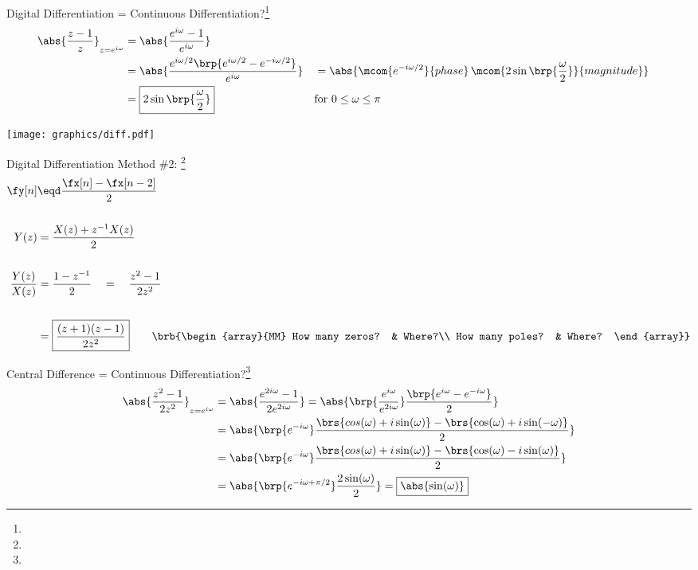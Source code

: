 \vfill
Digital Differentiation = Continuous Differentiation?\footnote{}
\vfill
\begin{align*}
  \abs{\frac{z-1}{z}}_{z=e^{i\omega}}
    &= \abs{\frac{e^{i\omega}-1}
                 {e^{i\omega}}
           }
  \\&= \abs{\frac{e^{i\omega/2}\brp{e^{i\omega/2}-e^{-i\omega/2}}}
                 {e^{i\omega}}
           }
   &&= \abs{\mcom{e^{-i\omega/2}}{phase}\,\mcom{{2\sin\brp{\frac{\omega}{2}}}}{magnitude}}
  \\&= \boxed{{2\sin\brp{\frac{\omega}{2}}}} 
    && \text{for $0\le\omega\le\pi$}
\end{align*}


\texttt{[image: graphics/diff.pdf]}


Digital Differentiation Method \#2: \footnote{}
\vfill
\begin{align*}
  \fy[n]
    &\eqd \frac{\fx[n] - \fx[n-2]}{2}
  \\\\
  Y(z) &= \frac{X(z) + z^{-1}X(z)}{2}
  \\\\
  \frac{Y(z)}{X(z)} &= \frac{1-z^{-1}}{2} \quad=\quad {\frac{z^2-1}{2z^2}}
  \\\\
                    &= \boxed{\frac{(z+1)(z-1)}{2z^2}} 
  \qquad\brb{\begin{array}{MM}
    How many zeros? & Where?\\
    How many poles? & Where?
  \end{array}}
\end{align*}


\vfill
Central Difference = Continuous Differentiation?\footnote{}
\vfill
\begin{align*}
  \abs{\frac{z^2-1}{2z^2}}_{z=e^{i\omega}}
    &= \abs{\frac{e^{2i\omega}-1}
                 {2e^{2i\omega}}
           }
     = \abs{\brp{\frac{e^{i\omega}}{e^{2i\omega}}}
            \frac{\brp{e^{i\omega}-e^{-i\omega}}}{2}
           }
  \\&= \abs{\brp{e^{-i\omega}}
            \frac{\brs{cos(\omega)+i\sin(\omega)}-\brs{\cos(\omega)+i\sin(-\omega)}}{2}
           }
  \\&= \abs{\brp{e^{-i\omega}}
            \frac{\brs{cos(\omega)+i\sin(\omega)}-\brs{\cos(\omega)-i\sin(\omega)}}{2}
           }
  \\&= \abs{\brp{e^{-i\omega+\pi/2}}
            \frac{2\sin(\omega)}{2}
           }
     = \boxed{\abs{\sin(\omega)}}
\end{align*}


